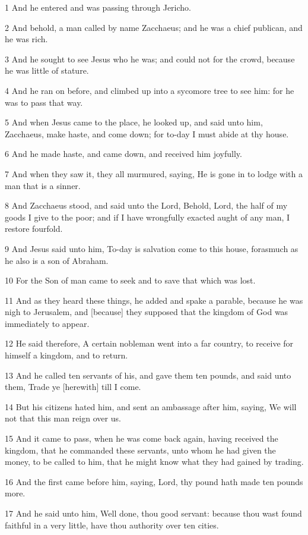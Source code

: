 \par 1 And he entered and was passing through Jericho.
\par 2 And behold, a man called by name Zacchaeus; and he was a chief publican, and he was rich.
\par 3 And he sought to see Jesus who he was; and could not for the crowd, because he was little of stature.
\par 4 And he ran on before, and climbed up into a sycomore tree to see him: for he was to pass that way.
\par 5 And when Jesus came to the place, he looked up, and said unto him, Zacchaeus, make haste, and come down; for to-day I must abide at thy house.
\par 6 And he made haste, and came down, and received him joyfully.
\par 7 And when they saw it, they all murmured, saying, He is gone in to lodge with a man that is a sinner.
\par 8 And Zacchaeus stood, and said unto the Lord, Behold, Lord, the half of my goods I give to the poor; and if I have wrongfully exacted aught of any man, I restore fourfold.
\par 9 And Jesus said unto him, To-day is salvation come to this house, forasmuch as he also is a son of Abraham.
\par 10 For the Son of man came to seek and to save that which was lost.
\par 11 And as they heard these things, he added and spake a parable, because he was nigh to Jerusalem, and [because] they supposed that the kingdom of God was immediately to appear.
\par 12 He said therefore, A certain nobleman went into a far country, to receive for himself a kingdom, and to return.
\par 13 And he called ten servants of his, and gave them ten pounds, and said unto them, Trade ye [herewith] till I come.
\par 14 But his citizens hated him, and sent an ambassage after him, saying, We will not that this man reign over us.
\par 15 And it came to pass, when he was come back again, having received the kingdom, that he commanded these servants, unto whom he had given the money, to be called to him, that he might know what they had gained by trading.
\par 16 And the first came before him, saying, Lord, thy pound hath made ten pounds more.
\par 17 And he said unto him, Well done, thou good servant: because thou wast found faithful in a very little, have thou authority over ten cities.
